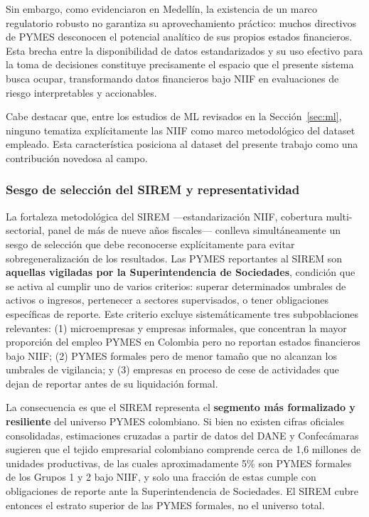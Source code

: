 \documentclass[12pt, letterpaper]{article}
\begin{document}
Sin embargo, como evidenciaron \citet{CardonaZuleta2025} en Medell\'in, la existencia de un marco regulatorio robusto no garantiza su aprovechamiento pr\'actico: muchos directivos de PYMES desconocen el potencial anal\'itico de sus propios estados financieros. Esta brecha entre la disponibilidad de datos estandarizados y su uso efectivo para la toma de decisiones constituye precisamente el espacio que el presente sistema busca ocupar, transformando datos financieros bajo NIIF en evaluaciones de riesgo interpretables y accionables.

Cabe destacar que, entre los estudios de ML revisados en la Secci\'on~\ref{sec:ml}, ninguno tematiza expl\'icitamente las NIIF como marco metodol\'ogico del dataset empleado. Esta caracter\'istica posiciona al dataset del presente trabajo como una contribuci\'on novedosa al campo.

\subsubsection{Sesgo de selecci\'on del SIREM y representatividad}
\label{sec:sirem-sesgo}

La fortaleza metodol\'ogica del SIREM ---estandarizaci\'on NIIF, cobertura multi-sectorial, panel de m\'as de nueve a\~nos fiscales--- conlleva simult\'aneamente un sesgo de selecci\'on que debe reconocerse expl\'icitamente para evitar sobregeneralizaci\'on de los resultados. Las PYMES reportantes al SIREM son \textbf{aquellas vigiladas por la Superintendencia de Sociedades}, condici\'on que se activa al cumplir uno de varios criterios: superar determinados umbrales de activos o ingresos, pertenecer a sectores supervisados, o tener obligaciones espec\'ificas de reporte. Este criterio excluye sistem\'aticamente tres subpoblaciones relevantes: (1) microempresas y empresas informales, que concentran la mayor proporci\'on del empleo PYMES en Colombia pero no reportan estados financieros bajo NIIF; (2) PYMES formales pero de menor tama\~no que no alcanzan los umbrales de vigilancia; y (3) empresas en proceso de cese de actividades que dejan de reportar antes de su liquidaci\'on formal.

La consecuencia es que el SIREM representa el \textbf{segmento m\'as formalizado y resiliente} del universo PYMES colombiano. Si bien no existen cifras oficiales consolidadas, estimaciones cruzadas a partir de datos del DANE y Confec\'amaras sugieren que el tejido empresarial colombiano comprende cerca de 1,6 millones de unidades productivas, de las cuales aproximadamente 5\% son PYMES formales de los Grupos 1 y 2 bajo NIIF, y solo una fracci\'on de estas cumple con obligaciones de reporte ante la Superintendencia de Sociedades. El SIREM cubre entonces el estrato superior de las PYMES formales, no el universo total.
\end{document}
